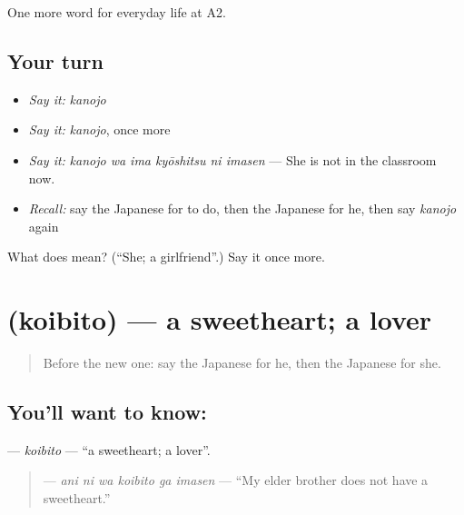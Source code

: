 \begin{grammarlens}[title={What you've built}]
One more word for everyday life at A2.
\end{grammarlens}

\subsection*{Your turn}
\begin{itemize}
\raggedright
  \item \emph{Say it:} \emph{kanojo}
  \item \emph{Say it:} \emph{kanojo}, once more
  \item \emph{Say it:} \emph{kanojo wa ima kyōshitsu ni imasen} — She is not in the classroom now.
  \item \emph{Recall:} say the Japanese for to do, then the Japanese for he, then say \emph{kanojo} again
\end{itemize}

\begin{tcolorbox}[breakable,colback=teal!4,colframe=teal!35!black,title={Before you move on}]
What does  mean? (\textquotedblleft{}She; a girlfriend\textquotedblright{}.) Say it once more.
\end{tcolorbox}
\section[\texorpdfstring{\ja{こいびと} (koibito)}{こいびと (koibito)}]{ (koibito) — a sweetheart; a lover}

\label{lesson:JA-C242-koibito}



\begin{quote}
Before the new one: say the Japanese for he, then the Japanese for she.
\end{quote}

\subsection*{You'll want to know: }
\textbf{} — \emph{koibito} — \textquotedblleft{}a sweetheart; a lover\textquotedblright{}.

\begin{quote}
\textbf{  } — \emph{ani ni wa koibito ga imasen} — \textquotedblleft{}My elder brother does not have a sweetheart.\textquotedblright{}
\end{quote}

